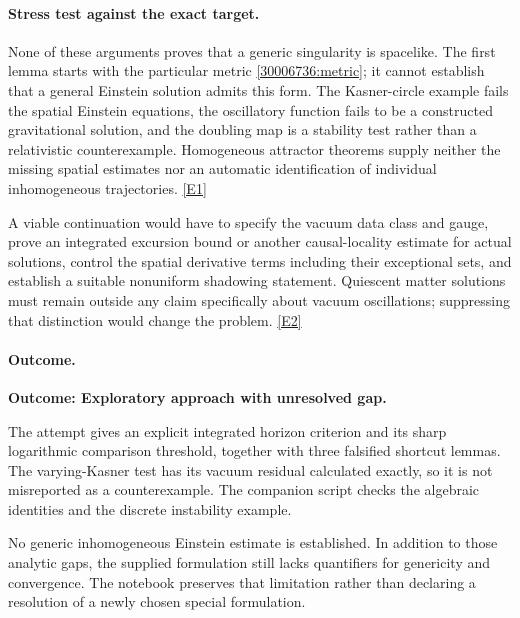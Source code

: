 \documentclass[11pt,a4paper]{article}
\newcommand{\eref}[2]{\hyperlink{extra:#1:#2}{[E#2]}}
\numberwithin{equation}{section}
\begin{document}
\paragraph{Stress test against the exact target.}
None of these arguments proves that a generic singularity is spacelike.
The first lemma starts with the particular metric \eqref{30006736:metric}; it
cannot establish that a general Einstein solution admits this form. The
Kasner-circle example fails the spatial Einstein equations, the oscillatory
function fails to be a constructed gravitational solution, and the doubling
map is a stability test rather than a relativistic counterexample.
Homogeneous attractor theorems supply neither the missing spatial estimates
nor an automatic identification of individual inhomogeneous trajectories.
\eref{30006736}{1}

A viable continuation would have to specify the vacuum data class and gauge,
prove an integrated excursion bound or another causal-locality estimate for
actual solutions, control the spatial derivative terms including their
exceptional sets, and establish a suitable nonuniform shadowing statement.
Quiescent matter solutions must remain outside any claim specifically about
vacuum oscillations; suppressing that distinction would change the problem.
\eref{30006736}{2}

\paragraph{Outcome.}
\textbf{Outcome: Exploratory approach with unresolved gap.}

The attempt gives an explicit integrated horizon criterion and its sharp
logarithmic comparison threshold, together with three falsified shortcut
lemmas. The varying-Kasner test has its vacuum residual calculated exactly,
so it is not misreported as a counterexample. The companion script checks
the algebraic identities and the discrete instability example.

No generic inhomogeneous Einstein estimate is established. In addition to
those analytic gaps, the supplied formulation still lacks quantifiers for
genericity and convergence. The notebook preserves that limitation rather
than declaring a resolution of a newly chosen special formulation.
\end{document}
